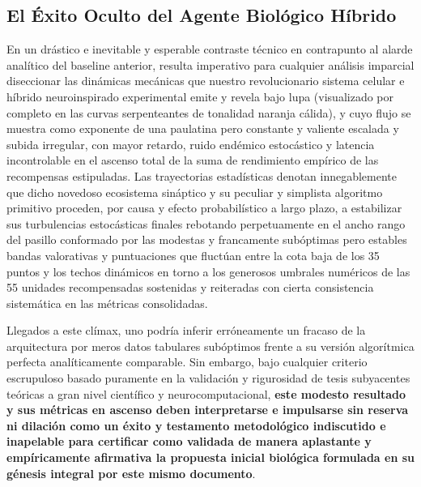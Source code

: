 \documentclass[a4paper,12pt,twocolumn]{article}
\begin{document}
\subsection{El Éxito Oculto del Agente Biológico Híbrido}
En un drástico e inevitable y esperable contraste técnico en contrapunto al alarde analítico del baseline anterior, resulta imperativo para cualquier análisis imparcial diseccionar las dinámicas mecánicas que nuestro revolucionario sistema celular e híbrido neuroinspirado experimental emite y revela bajo lupa (visualizado por completo en las curvas serpenteantes de tonalidad naranja cálida), y cuyo flujo se muestra como exponente de una paulatina pero constante y valiente escalada y subida irregular, con mayor retardo, ruido endémico estocástico y latencia incontrolable en el ascenso total de la suma de rendimiento empírico de las recompensas estipuladas. Las trayectorias estadísticas denotan innegablemente que dicho novedoso ecosistema sináptico y su peculiar y simplista algoritmo primitivo proceden, por causa y efecto probabilístico a largo plazo, a estabilizar sus turbulencias estocásticas finales rebotando perpetuamente en el ancho rango del pasillo conformado por las modestas y francamente subóptimas pero estables bandas valorativas y puntuaciones que fluctúan entre la cota baja de los 35 puntos y los techos dinámicos en torno a los generosos umbrales numéricos de las 55 unidades recompensadas sostenidas y reiteradas con cierta consistencia sistemática en las métricas consolidadas.

Llegados a este clímax, uno podría inferir erróneamente un fracaso de la arquitectura por meros datos tabulares subóptimos frente a su versión algorítmica perfecta analíticamente comparable. Sin embargo, bajo cualquier criterio escrupuloso basado puramente en la validación y rigurosidad de tesis subyacentes teóricas a gran nivel científico y neurocomputacional, \textbf{este modesto resultado y sus métricas en ascenso deben interpretarse e impulsarse sin reserva ni dilación como un éxito y testamento metodológico indiscutido e inapelable para certificar como validada de manera aplastante y empíricamente afirmativa la propuesta inicial biológica formulada en su génesis integral por este mismo documento}.
\end{document}
